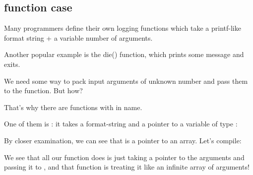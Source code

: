 \subsection{ function case}

Many programmers define their own logging functions which take a printf-like format string + 
a variable number of arguments.

Another popular example is the die() function, which prints some message and exits.

We need some way to pack input arguments of unknown number and pass them to the \printf function.
But how?

That's why there are functions with  in name.

One of them is : it takes a format-string and a pointer to a variable of type :



By closer examination, we can see that  is a pointer to an array.
Let's compile:



We see that all our function does is just taking a pointer to the arguments and
passing it to , and that function is treating it like an infinite array of arguments!


